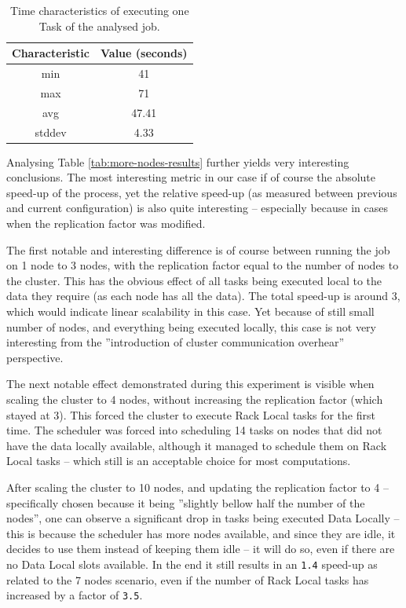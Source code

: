 \begin{table}[bth!]
  \centering
  \begin{tabular}{|c|c|}
  \hline
    \textbf{Characteristic} & \textbf{Value (seconds)} \\ \hline
    min                     & 41     \\ \hline
    max                     & 71     \\ \hline
    avg                 	    & 47.41  \\ \hline
    stddev                  & 4.33   \\ \hline
  \end{tabular}
  \caption{Time characteristics of executing one Task of the analysed job.}
  \label{tab:time-task}
\end{table}

Analysing Table \ref{tab:more-nodes-results} further yields very interesting conclusions. The most interesting metric in our case if of course the absolute speed-up of the process, yet the relative speed-up (as measured between previous and current configuration) is also quite interesting -- especially because in cases when the replication factor was modified.

The first notable and interesting difference is of course between running the job on 1 node to 3 nodes, with the replication factor equal to the number of nodes to the cluster. This has the obvious effect of all tasks being executed local to the data they require (as each node has all the data). The total speed-up is around 3, which would indicate linear scalability in this case. Yet because of still small number of nodes, and everything being executed locally, this case is not very interesting from the ''introduction of cluster communication overhear'' perspective.

The next notable effect demonstrated during this experiment is visible when scaling the cluster to 4 nodes, without increasing the replication factor (which stayed at 3). This forced the cluster to execute Rack Local tasks for the first time. The scheduler was forced into scheduling 14 tasks on nodes that did not have the data locally available, although it managed to schedule them on Rack Local tasks -- which still is an acceptable choice for most computations.

After scaling the cluster to 10 nodes, and updating the replication factor to 4 -- specifically chosen because it being ''slightly bellow half the number of the nodes'', one can observe a significant drop in tasks being executed Data Locally -- this is because the scheduler has more nodes available, and since they are idle, it decides to use them instead of keeping them idle -- it will do so, even if there are no Data Local slots available. In the end it still results in an \verb|1.4| speed-up as related to the 7 nodes scenario, even if the number of Rack Local tasks has increased by a factor of \verb|3.5|.

